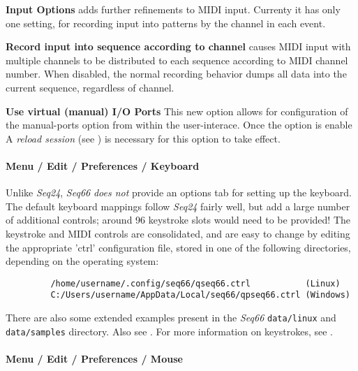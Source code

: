    \textbf{Input Options} adds further refinements to MIDI input.
   Currenty it has only one setting, for recording input into patterns by the
   channel in each event.

   \textbf{Record input into sequence according to channel}
   causes MIDI input with multiple channels to be distributed to
   each sequence according to MIDI channel number.
   When disabled, the normal recording behavior dumps all data into the current
   sequence, regardless of channel.

   \textbf{Use virtual (manual) I/O Ports}
   This new option
   allows for configuration of the manual-ports option from within the
   user-interace. 
   Once the option is enable
   A \textsl{reload session} (see )
   is necessary for this option to take effect.

\paragraph{Menu / Edit / Preferences / Keyboard}
\label{paragraph:menu_edit_preferences_keyboard}

   Unlike \textsl{Seq24}, \textsl{Seq66}
   \textsl{does not} provide an options tab for
   setting up the keyboard.
   The default keyboard mappings follow \textsl{Seq24} fairly well,
   but add a large number of additional controls;
   around 96 keystroke slots would need to be provided!
   The keystroke and MIDI controls are consolidated, and are easy to change by
   editing the appropriate 'ctrl' configuration file, stored in one of the
   following directories, depending on
   the operating system:
   
   \begin{verbatim}
         /home/username/.config/seq66/qseq66.ctrl           (Linux)
         C:/Users/username/AppData/Local/seq66/qpseq66.ctrl (Windows)
   \end{verbatim}

   There are also some extended examples present in the \textsl{Seq66}
   \texttt{data/linux} and
   \texttt{data/samples} directory.
   Also see .
   For more information on keystrokes, see
   .

\paragraph{Menu / Edit / Preferences / Mouse}
\label{paragraph:menu_edit_preferences_mouse}

